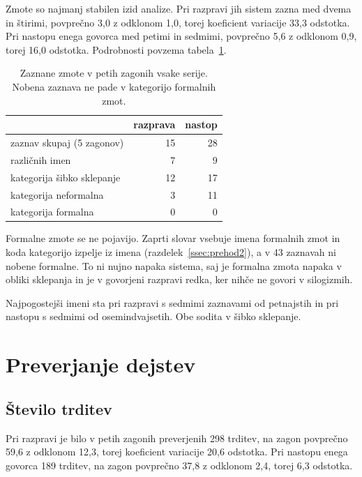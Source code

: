 \documentclass[a4paper, 12pt]{book}
\begin{document}
Zmote so najmanj stabilen izid analize. Pri razpravi jih sistem zazna med dvema
in štirimi, povprečno 3,0 z odklonom 1,0, torej koeficient variacije 33,3
odstotka. Pri nastopu enega govorca med petimi in sedmimi, povprečno 5,6 z
odklonom 0,9, torej 16,0 odstotka. Podrobnosti povzema
tabela~\ref{tbl:zmote-stabilnost}.

\begin{table}[htbp]
\centering
\begin{tabular}{lrr}
\toprule
& razprava & nastop \\
\midrule
zaznav skupaj (5 zagonov)     & 15 & 28 \\
različnih imen                & 7 & 9 \\
kategorija šibko sklepanje    & 12 & 17 \\
kategorija neformalna         & 3 & 11 \\
kategorija formalna           & 0 & 0 \\
\bottomrule
\end{tabular}
\caption{Zaznane zmote v petih zagonih vsake serije. Nobena zaznava ne pade v
kategorijo formalnih zmot.}
\label{tbl:zmote-stabilnost}
\end{table}

Formalne zmote se ne pojavijo. Zaprti slovar vsebuje imena formalnih zmot in
koda kategorijo izpelje iz imena (razdelek~\ref{ssec:prehod2}), a v 43 zaznavah
ni nobene formalne. To ni nujno napaka sistema, saj je formalna zmota napaka v
obliki sklepanja in je v govorjeni razpravi redka, ker nihče ne govori v
silogizmih.

Najpogostejši imeni sta pri razpravi  s sedmimi zaznavami od
petnajstih in pri nastopu  s sedmimi od osemindvajsetih. Obe sodita
v šibko sklepanje.

\section{Preverjanje dejstev}
\label{sec:dejstva-meritev}

\subsection{Število trditev}
\label{ssec:koliko-trditev}

Pri razpravi je bilo v petih zagonih preverjenih 298 trditev, na zagon
povprečno 59,6 z odklonom 12,3, torej koeficient variacije 20,6 odstotka. Pri
nastopu enega govorca 189 trditev, na zagon povprečno 37,8 z odklonom 2,4, torej
6,3 odstotka.
\end{document}
